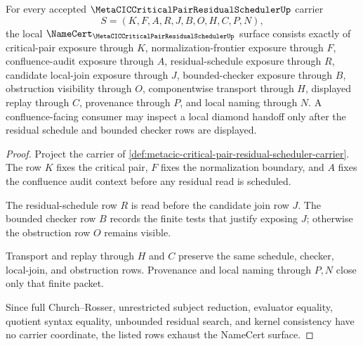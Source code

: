 \begin{theorem}
\label{thm:metacic-critical-pair-residual-scheduler-obligations}
For every accepted $\MetaCICCriticalPairResidualSchedulerUp$ carrier
$$
S=(K,F,A,R,J,B,O,H,C,P,N),
$$
the local $\NameCert_{\MetaCICCriticalPairResidualSchedulerUp}$ surface consists exactly of critical-pair exposure through $K$, normalization-frontier exposure through $F$, confluence-audit exposure through $A$, residual-schedule exposure through $R$, candidate local-join exposure through $J$, bounded-checker exposure through $B$, obstruction visibility through $O$, componentwise transport through $H$, displayed replay through $C$, provenance through $P$, and local naming through $N$. A confluence-facing consumer may inspect a local diamond handoff only after the residual schedule and bounded checker rows are displayed.
\end{theorem}
\begin{proof}
Project the carrier of \autoref{def:metacic-critical-pair-residual-scheduler-carrier}. The row $K$ fixes the critical pair, $F$ fixes the normalization boundary, and $A$ fixes the confluence audit context before any residual read is scheduled.

The residual-schedule row $R$ is read before the candidate join row $J$. The bounded checker row $B$ records the finite tests that justify exposing $J$; otherwise the obstruction row $O$ remains visible.

Transport and replay through $H$ and $C$ preserve the same schedule, checker, local-join, and obstruction rows. Provenance and local naming through $P,N$ close only that finite packet.

Since full Church--Rosser, unrestricted subject reduction, evaluator equality, quotient syntax equality, unbounded residual search, and kernel consistency have no carrier coordinate, the listed rows exhaust the NameCert surface.
\end{proof}

